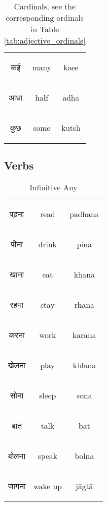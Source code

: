 \begin{table}[H]
\begin{tabular}{c|c|c}
    \begin{hindi} कई  \end{hindi} & many & kaee \\
    \begin{hindi} आधा  \end{hindi} & half & adha \\
    \begin{hindi} कुछ  \end{hindi} & some & kutsh \\
    \end{tabular}
    \caption{Cardinals, see the corresponding ordinals in Table \ref{tab:adjective_ordinals}}
    \label{tab:nouns_cardinals}
\end{table}

\newpage 
\subsection{Verbs}


\begin{table}[H]
    \centering
    \begin{tabular}{c|c|c}
        \begin{hindi} पढ़ना \end{hindi} & read &  padhana\\
        \begin{hindi} पीना \end{hindi} & drink &  pina \\
        \begin{hindi} खाना \end{hindi} & eat &  khana \\
        \begin{hindi} रहना \end{hindi} & stay &  rhana \\
        \begin{hindi} करना \end{hindi} & work &  karana \\
        \begin{hindi} खेलना \end{hindi} & play &  khlana \\
        \begin{hindi} सोना \end{hindi} & sleep & sona \\
        \begin{hindi} बात \end{hindi} & talk & bat \\
        \begin{hindi} बोलना \end{hindi} & speak & bolna \\
        \begin{hindi} जागना \end{hindi} & wake up & jāgtā \\

    \end{tabular}
    \caption{Infinitive Any}
    \label{tab:verbs_any}
\end{table}





